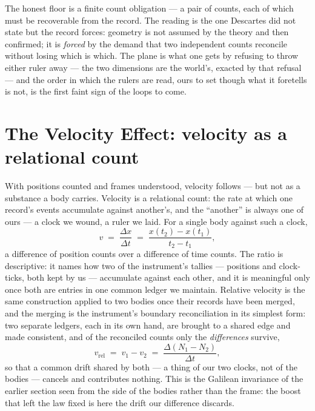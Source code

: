 The honest floor is a finite count obligation --- a pair of counts, each of which must be recoverable from the
record. The reading is the one Descartes did not state but the record forces: geometry is not assumed by the
theory and then confirmed; it is \emph{forced} by the demand that two independent counts reconcile without
losing which is which. The plane is what one gets by refusing to throw either ruler away --- the two
dimensions are the world's, exacted by that refusal --- and the order in which the rulers are read, ours to
set though what it foretells is not, is the first faint sign of the loops to come.

\section{The Velocity Effect: velocity as a relational count}
\label{se:velocity}

With positions counted and frames understood, velocity follows --- but not as a substance a body carries.
Velocity is a relational count: the rate at which one record's events accumulate against another's, and the
``another'' is always one of ours --- a clock we wound, a ruler we laid. For a single body against such a
clock,
\begin{equation}
  v \;=\; \frac{\Delta x}{\Delta t} \;=\; \frac{x(t_2) - x(t_1)}{t_2 - t_1},
\end{equation}
a difference of position counts over a difference of time counts. The ratio is descriptive: it names how two
of the instrument's tallies --- positions and clock-ticks, both kept by us --- accumulate against each other,
and it is meaningful only once both are entries in one common ledger we maintain. Relative velocity is the
same construction applied to two bodies once their records have been merged, and the merging is the
instrument's boundary reconciliation in its simplest form: two separate ledgers, each in its own hand, are
brought to a shared edge and made consistent, and of the reconciled counts only the \emph{differences}
survive,
\begin{equation}
  v_{\mathrm{rel}} \;=\; v_1 - v_2 \;=\; \frac{\Delta(N_1 - N_2)}{\Delta t},
\end{equation}
so that a common drift shared by both --- a thing of our two clocks, not of the bodies --- cancels and
contributes nothing. This is the Galilean invariance of the earlier section seen from the side of the bodies
rather than the frame: the boost that left the law fixed is here the drift our difference discards.

